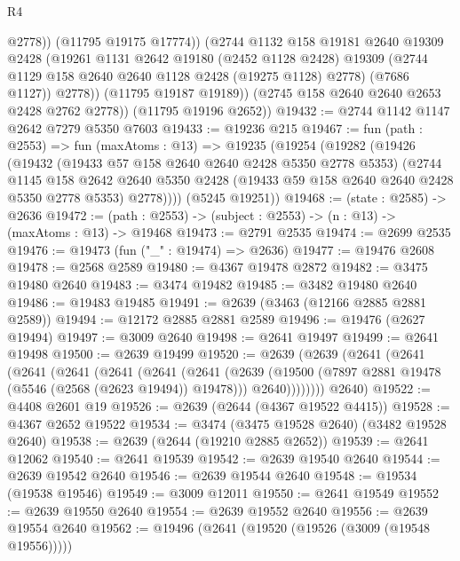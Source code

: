 \begin{lexlean}{R4}
\begin{coremodule}
                  @2778))
              (@11795 @19175 @17774))
            (@2744
              @1132
              @158
              @19181
              @2640
              @19309
              @2428
              (@19261
                @1131
                @2642
                @19180
                (@2452 @1128 @2428)
                @19309
                (@2744 @1129 @158 @2640 @2640 @1128 @2428 (@19275 @1128) @2778)
                (@7686 @1127))
              @2778))
          (@11795 @19187 @19189))
        (@2745 @158 @2640 @2640 @2653 @2428 @2762 @2778))
      (@11795 @19196 @2652))
@19432 := @2744 @1142 @1147 @2642 @7279 @5350 @7603
@19433 := @19236 @215
@19467 := fun (path : @2553) =>
  fun (maxAtoms : @13) =>
  @19235
    (@19254
      (@19282
        (@19426
          (@19432
            (@19433 @57 @158 @2640 @2640 @2428 @5350 @2778 @5353)
            (@2744
              @1145
              @158
              @2642
              @2640
              @5350
              @2428
              (@19433 @59 @158 @2640 @2640 @2428 @5350 @2778 @5353)
              @2778))))
      (@5245 @19251))
@19468 := (state : @2585) -> @2636
@19472 := (path : @2553) -> (subject : @2553) -> (n : @13) -> (maxAtoms : @13) -> @19468
@19473 := @2791 @2535
@19474 := @2699 @2535
@19476 := @19473 (fun ("_" : @19474) => @2636)
@19477 := @19476 @2608
@19478 := @2568 @2589
@19480 := @4367 @19478 @2872
@19482 := @3475 @19480 @2640
@19483 := @3474 @19482
@19485 := @3482 @19480 @2640
@19486 := @19483 @19485
@19491 := @2639 (@3463 (@12166 @2885 @2881 @2589))
@19494 := @12172 @2885 @2881 @2589
@19496 := @19476 (@2627 @19494)
@19497 := @3009 @2640
@19498 := @2641 @19497
@19499 := @2641 @19498
@19500 := @2639 @19499
@19520 := @2639
    (@2639
      (@2641
        (@2641
          (@2641
            (@2641
              (@2641
                (@2641
                  (@2641
                    (@2639
                      (@19500 (@7897 @2881 @19478 (@5546 (@2568 (@2623 @19494)) @19478)))
                      @2640))))))))
      @2640)
@19522 := @4408 @2601 @19
@19526 := @2639 (@2644 (@4367 @19522 @4415))
@19528 := @4367 @2652 @19522
@19534 := @3474 (@3475 @19528 @2640) (@3482 @19528 @2640)
@19538 := @2639 (@2644 (@19210 @2885 @2652))
@19539 := @2641 @12062
@19540 := @2641 @19539
@19542 := @2639 @19540 @2640
@19544 := @2639 @19542 @2640
@19546 := @2639 @19544 @2640
@19548 := @19534 (@19538 @19546)
@19549 := @3009 @12011
@19550 := @2641 @19549
@19552 := @2639 @19550 @2640
@19554 := @2639 @19552 @2640
@19556 := @2639 @19554 @2640
@19562 := @19496 (@2641 (@19520 (@19526 (@3009 (@19548 @19556)))))

\end{coremodule}
\end{lexlean}
